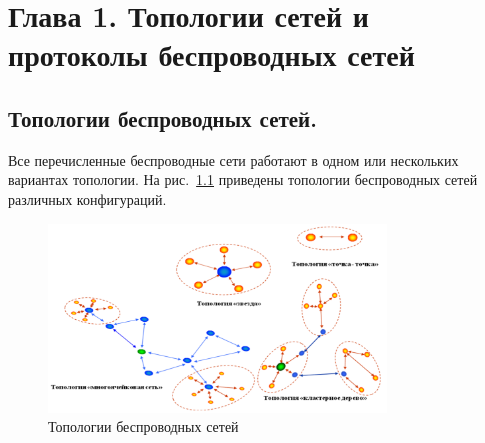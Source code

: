 \documentclass[14pt, a4paper]{extreport}
\begin{document}

\newpage

\chapter{Глава 1. Топологии сетей и протоколы беспроводных сетей}

\section{Топологии беспроводных сетей.}
Все перечисленные беспроводные сети работают в одном или нескольких вариантах
топологии. На рис.~\ref{fig:topologies} приведены топологии беспроводных сетей различных конфигураций.

\begin{figure}[ht]
    \centering
    \includegraphics[width=0.8\textwidth]{images/Fig06.png}
    \caption{Топологии беспроводных сетей \cite{wirelessNetProtocols} }
    \label{fig:topologies}
\end{figure}
\end{document}

